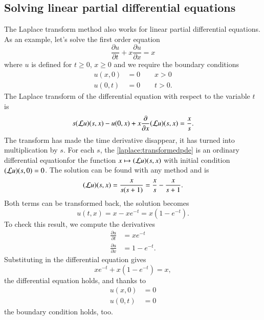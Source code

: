 \subsection{Solving linear partial differential equations}
The Laplace transform method also works for linear partial differential
equations.
As an example, let's solve the first order equation
\[
\frac{\partial u}{\partial t}+x\frac{\partial u}{\partial x}=x
\]
where $u$ is defined for $t\ge 0$, $x\ge 0$ and we require the
boundary conditions
\begin{align*}
u(x,0)&=0\qquad x>0\\
u(0,t)&=0\qquad t>0.
\end{align*}
The Laplace transform of the differential equation with respect to
the variable $t$ is
\begin{equation}
s({\cal L}u)(s,x)-u(0,x)+x\frac{\partial}{\partial x}({\cal L}u)(s,x)
=
\frac{x}{s}.
\label{laplace:transformedpde}
\end{equation}
The transform has made the time derivative disappear, it has
turned into multiplication by $s$.
For each $s$, the \eqref{laplace:transformedpde} is an ordinary
differential equationfor the function $x\mapsto ({\cal L}u)(s,x)$
with initial condition
$({\cal L}u)(s,0)=0$.
The solution can be found with any method and is
\[
({\cal L}u)(s,x)=\frac{x}{s(s+1)}=\frac{x}{s}-\frac{x}{s+1}.
\]
Both terms can be transformed back, the solution becomes
\[
u(t,x)=x-xe^{-t}=x(1-e^{-t}).
\]
To check this result, we compute the derivatives
\begin{align*}
\frac{\partial u}{\partial t}
&=
xe^{-t}
\\
\frac{\partial u}{\partial x}
&=
1-e^{-t}.
\end{align*}
Substituting in the differential equation gives
\[
xe^{-t}+x(1-e^{-t})=x,
\]
the differential equation holds, and thanks to
\begin{align*}
u(x,0)
&=
0
\\
u(0,t)
&=
0
\end{align*}
the boundary condition holds, too.

